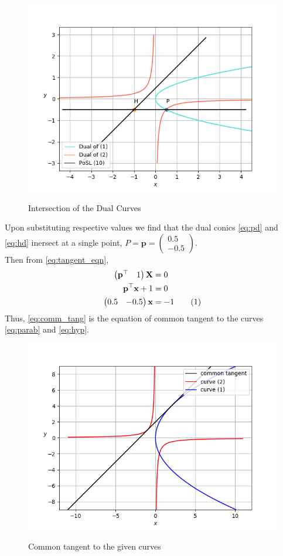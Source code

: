 \documentclass[journal,12pt,twocolumn]{IEEEtran}
\let\vec\mathbf
\newcommand{\myvec}[1]{\ensuremath{\begin{pmatrix}#1\end{pmatrix}}}
\newcommand\numberthis{\addtocounter{equation}{1}\tag{\theequation}}
\begin{document}
\begin{figure}[h]
\centering
%
\includegraphics[width=\columnwidth]{figs/dual_int.png}
\label{fig:dual_int}
\caption{Intersection of the Dual Curves}
\end{figure}

Upon substituting respective values we find that the dual conics \eqref{eq:pd} and \eqref{eq:hd} inersect at a single point, $P=\vec{p}=\myvec{0.5\\-0.5}$. 
\\[0.7ex]
Then from \eqref{eq:tangent_eqn}, 
\begin{align}
		\myvec{\vec{p}^{\top}&1}\vec{X} &= 0 \\
		\vec{p}^{\top}\vec{x} + 1 &= 0 \\
		\myvec{0.5&-0.5}\vec{x} &= -1 \label{eq:comm_tang} \numberthis
\end{align}
Thus, \eqref{eq:comm_tang} is the equation of common tangent to the curves \eqref{eq:parab} and \eqref{eq:hyp}.
\newpage

\begin{figure}[h!]
\centering
%
\includegraphics[width=\columnwidth]{figs/comm_tan.png}
\label{fig:comm_tan}
\caption{Common tangent to the given curves}
\end{figure}
\end{document}
